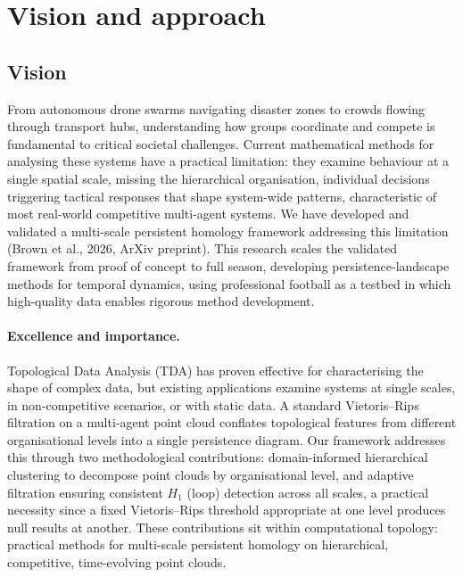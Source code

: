\section{Vision and approach}

\subsection{Vision}

From autonomous drone swarms navigating disaster zones to crowds flowing through transport hubs, understanding how groups coordinate and compete is fundamental to critical societal challenges. Current mathematical methods for analysing these systems have a practical limitation: they examine behaviour at a single spatial scale, missing the hierarchical organisation, individual decisions triggering tactical responses that shape system-wide patterns, characteristic of most real-world competitive multi-agent systems. We have developed and validated a multi-scale persistent homology framework addressing this limitation (Brown et al., 2026, ArXiv preprint). This research scales the validated framework from proof of concept to full season, developing persistence-landscape methods for temporal dynamics, using professional football as a testbed in which high-quality data enables rigorous method development.

\paragraph{Excellence and importance.}
Topological Data Analysis (TDA) has proven effective for characterising the shape of complex data, but existing applications examine systems at single scales, in non-competitive scenarios, or with static data. A standard Vietoris--Rips filtration on a multi-agent point cloud conflates topological features from different organisational levels into a single persistence diagram. Our framework addresses this through two methodological contributions: domain-informed hierarchical clustering to decompose point clouds by organisational level, and adaptive filtration ensuring consistent $H_1$ (loop) detection across all scales, a practical necessity since a fixed Vietoris--Rips threshold appropriate at one level produces null results at another. These contributions sit within computational topology: practical methods for multi-scale persistent homology on hierarchical, competitive, time-evolving point clouds.

